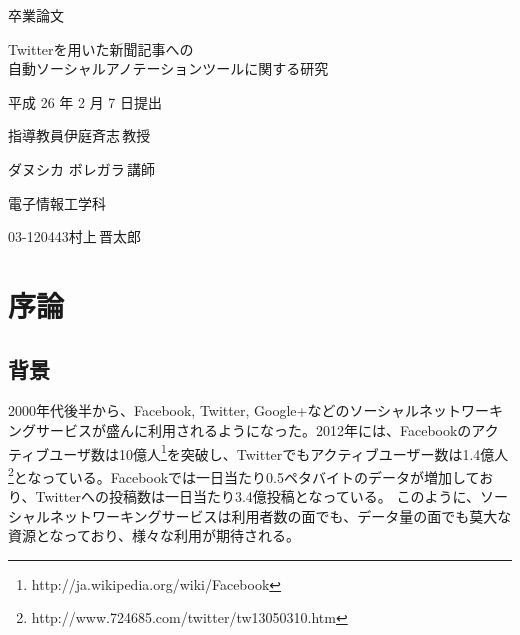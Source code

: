 \documentclass[12pt]{jarticle}
\begin{document}
\pagestyle{empty}
\begin{center}
  \vspace*{3.0cm}
  {\fontsize{80pt}{100pt}\selectfont 卒業論文}

  \vspace*{2.0cm}

  \begin{LARGE}
    Twitterを用いた新聞記事への\\
    自動ソーシャルアノテーションツールに関する研究
    \vspace*{2.0cm}

    平成 26 年 2 月 7 日提出
  \end{LARGE}

\end{center}
\begin{LARGE}
  \vspace*{1.0cm}
  \hspace{25mm}指導教員\hspace{51mm}伊庭斉志\,教授

  \hspace{70mm}ダヌシカ ボレガラ\,講師

  \vspace*{1.0cm}
  \begin{center}
    電子情報工学科

    \vspace{1.0cm}
    03-120443\hspace{15mm}村上\,晋太郎
  \end{center}

\end{LARGE}

\newpage
\tableofcontents

\newpage
\setcounter{page}{1}
\pagestyle{plain}

\section{序論}
\subsection{背景}
2000年代後半から、Facebook, Twitter, Google+などのソーシャルネットワーキングサービスが盛んに利用されるようになった。2012年には、Facebookのアクティブユーザ数は10億人\footnote{http://ja.wikipedia.org/wiki/Facebook}を突破し、Twitterでもアクティブユーザー数は1.4億人\footnote{http://www.724685.com/twitter/tw13050310.htm}となっている。Facebookでは一日当たり0.5ペタバイトのデータが増加しており、Twitterへの投稿数は一日当たり3.4億投稿となっている。
このように、ソーシャルネットワーキングサービスは利用者数の面でも、データ量の面でも莫大な資源となっており、様々な利用が期待される。
\end{document}
